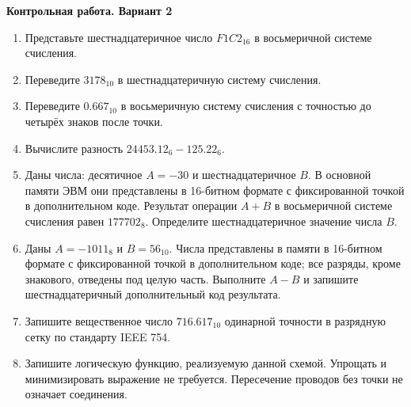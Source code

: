\documentclass[a4paper,14pt]{extreport}
\begin{document}
\begin{center}\textbf{Контрольная работа. Вариант 2}\end{center}
\begin{enumerate}
    \item Представьте шестнадцатеричное число $F1C2_{16}$ в восьмеричной системе счисления.
    \item Переведите $3178_{10}$ в шестнадцатеричную систему счисления.
    \item Переведите $0.667_{10}$ в восьмеричную систему счисления с точностью до четырёх знаков после точки.
    \item Вычислите разность $24453.12_6-125.22_6$.
    \item Даны числа: десятичное $A=-30$ и шестнадцатеричное $B$. В основной памяти ЭВМ они представлены в 16-битном формате с фиксированной точкой в дополнительном коде. Результат операции $A+B$ в восьмеричной системе счисления равен $177702_8$. Определите шестнадцатеричное значение числа $B$.
    \item Даны $A=-1011_8$ и $B=56_{10}$. Числа представлены в памяти в 16-битном формате с фиксированной точкой в дополнительном коде; все разряды, кроме знакового, отведены под целую часть. Выполните $A-B$ и запишите шестнадцатеричный дополнительный код результата.
    \item Запишите вещественное число $716.617_{10}$ одинарной точности в разрядную сетку по стандарту IEEE 754.
    \item Запишите логическую функцию, реализуемую данной схемой. Упрощать и минимизировать выражение не требуется. Пересечение проводов без точки не означает соединения.
    \krCommonScheme
\end{enumerate}
\end{document}

